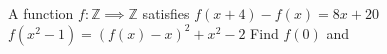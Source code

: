 A function $f:\mathbb{Z}\implies\mathbb{Z}$ satisfies
$f(x+4)-f(x)=8x+20$
$f(x^2-1)=(f(x)-x)^2+x^2-2$
Find $f(0)$ and 